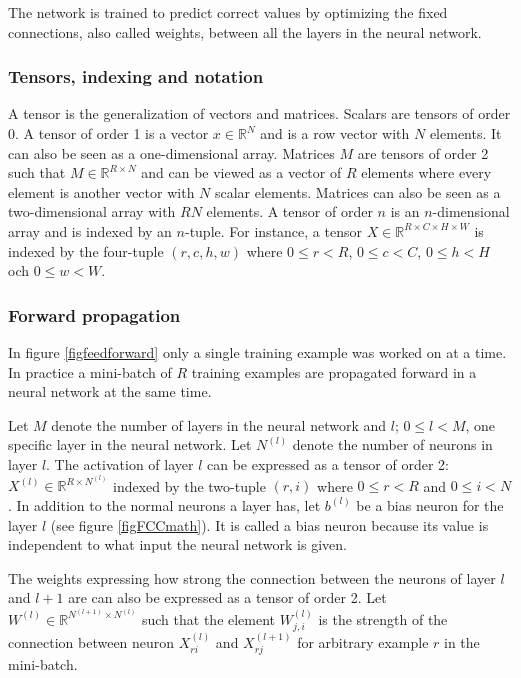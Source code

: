 \documentclass[a4paper,11pt,twoside]{article}
\begin{document}
The network is trained to predict correct values by optimizing the fixed connections, also called weights, between all the layers in the neural network. \cite{cs231n}


\subsubsection{Tensors, indexing and notation}
A tensor is the generalization of vectors and matrices. Scalars are tensors of order 0. A tensor of order 1 is a vector $x \in \mathbb{R}^N$ and is a row vector with $N$ elements. It can also be seen as a one-dimensional array. Matrices $M$ are tensors of order 2 such that $M \in \mathbb{R}^{R \times N}$ and can be viewed as a vector of $R$ elements where every element is another vector with $N$ scalar elements. Matrices can also be seen as a two-dimensional array with $RN$ elements. A tensor of order $n$ is an $n$-dimensional array and is indexed by an $n$-tuple. For instance, a tensor $X \in \mathbb{R}^{R \times C \times H \times W}$ is indexed by the four-tuple $(r,c,h,w)$ where $0 \leq r < R$, $0 \leq c < C$, $0 \leq h < H$ och $0 \leq w < W$. \cite{cs231n}

\subsubsection{Forward propagation}
In figure \ref{figfeedforward} only a single training example was worked on at a time. In practice a mini-batch of $R$ training examples are propagated forward in a neural network at the same time. \cite{cs231n} \cite{wikiStanford}

Let $M$ denote the number of layers in the neural network and $l$; $0 \leq l < M$, one specific layer in the neural network. Let $N^{(l)}$ denote the number of neurons in layer $l$. The activation of layer $l$ can be expressed as a tensor of order 2: $X^{(l)} \in \mathbb{R}^{R \times N^{(l)}}$ indexed by the two-tuple $(r,i)$ where $0 \leq r < R$ and $0 \leq i < N$. In addition to the normal neurons a layer has, let $b^{(l)}$ be a bias neuron for the layer $l$ (see figure \ref{figFCCmath}). It is called a bias neuron because its value is independent to what input the neural network is given. \cite{cs231n} \cite{wikiStanford}

The weights expressing how strong the connection between the neurons of layer $l$ and $l+1$ are can also be expressed as a tensor of order 2. Let $W^{(l)} \in \mathbb{R}^{N^{(l+1)}  \times N^{(l)}}$ such that the element $W_{j, i}^{(l)}$ is the strength of the connection between neuron $X_{ri}^{(l)}$ and $X_{rj}^{(l+1)}$ for arbitrary example $r$ in the mini-batch. \cite{cs231n} \cite{wikiStanford}
\end{document}
